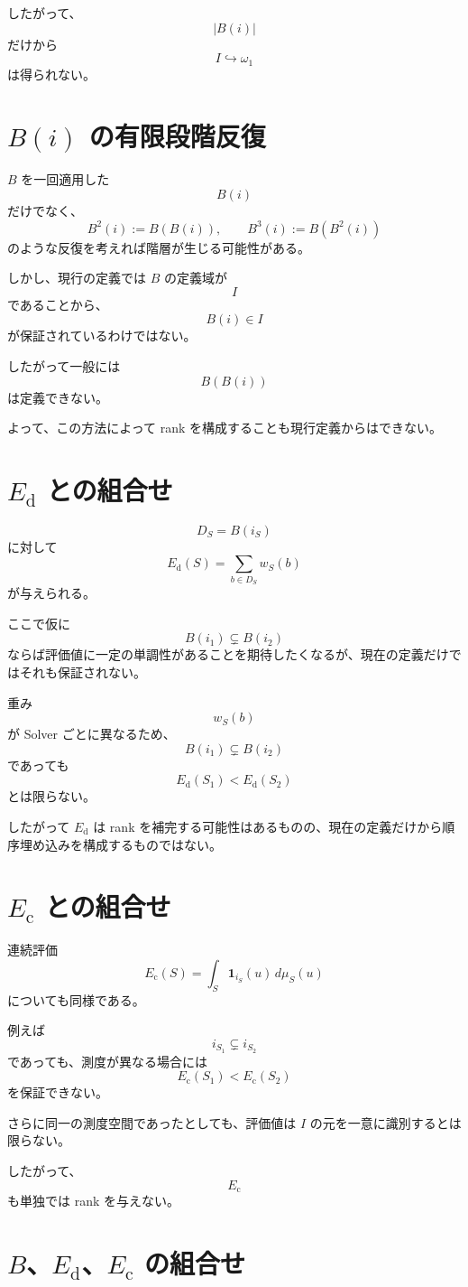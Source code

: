 \documentclass[a4paper,11pt]{article}
\begin{document}
したがって、
\[
|B(i)|
\]
だけから
\[
I\hookrightarrow\omega_1
\]
は得られない。

\section{$B(i)$ の有限段階反復}

$B$ を一回適用した
\[
B(i)
\]
だけでなく、
\[
B^2(i):=B(B(i)),
\qquad
B^3(i):=B(B^2(i))
\]
のような反復を考えれば階層が生じる可能性がある。

しかし、現行の定義では $B$ の定義域が
\[
I
\]
であることから、
\[
B(i)\in I
\]
が保証されているわけではない。

したがって一般には
\[
B(B(i))
\]
は定義できない。

よって、この方法によって rank を構成することも現行定義からはできない。

\section{$E_{\mathrm{d}}$ との組合せ}

\[
D_S=B(i_S)
\]
に対して
\[
E_{\mathrm{d}}(S)
=
\sum_{b\in D_S}w_S(b)
\]
が与えられる。

ここで仮に
\[
B(i_1)\subsetneq B(i_2)
\]
ならば評価値に一定の単調性があることを期待したくなるが、現在の定義だけではそれも保証されない。

重み
\[
w_S(b)
\]
が Solver ごとに異なるため、
\[
B(i_1)\subsetneq B(i_2)
\]
であっても
\[
E_{\mathrm{d}}(S_1)
<
E_{\mathrm{d}}(S_2)
\]
とは限らない。

したがって $E_{\mathrm{d}}$ は rank を補完する可能性はあるものの、現在の定義だけから順序埋め込みを構成するものではない。

\section{$E_{\mathrm{c}}$ との組合せ}

連続評価
\[
E_{\mathrm{c}}(S)
=
\int_S\mathbf1_{i_S}(u)\,d\mu_S(u)
\]
についても同様である。

例えば
\[
i_{S_1}\subsetneq i_{S_2}
\]
であっても、測度が異なる場合には
\[
E_{\mathrm{c}}(S_1)
<
E_{\mathrm{c}}(S_2)
\]
を保証できない。

さらに同一の測度空間であったとしても、評価値は $I$ の元を一意に識別するとは限らない。

したがって、
\[
E_{\mathrm{c}}
\]
も単独では rank を与えない。

\section{$B$、$E_{\mathrm{d}}$、$E_{\mathrm{c}}$ の組合せ}
\end{document}
